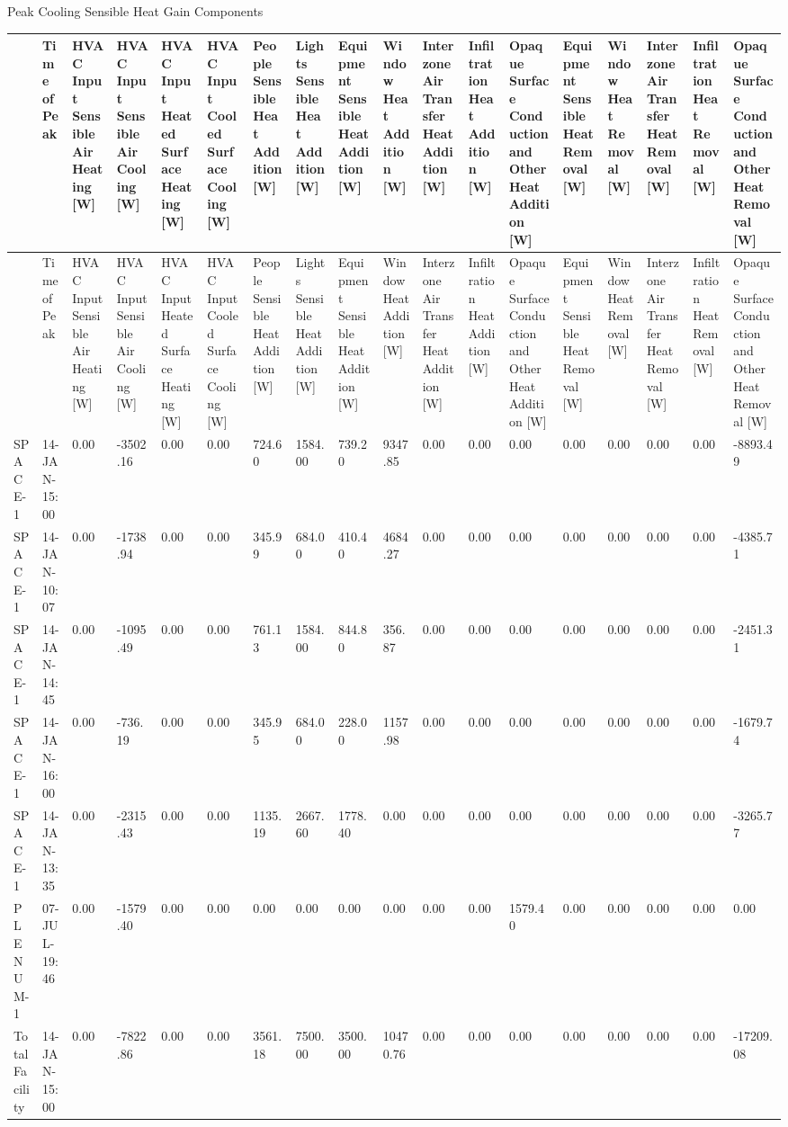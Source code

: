 Peak Cooling Sensible Heat Gain Components

{\tiny
\begin{longtable}[c]{>{\raggedright}p{0.28in}>{\raggedright}p{0.28in}>{\raggedright}p{0.28in}>{\raggedright}p{0.28in}>{\raggedright}p{0.28in}>{\raggedright}p{0.28in}>{\raggedright}p{0.28in}>{\raggedright}p{0.28in}>{\raggedright}p{0.28in}>{\raggedright}p{0.28in}>{\raggedright}p{0.28in}>{\raggedright}p{0.28in}>{\raggedright}p{0.28in}>{\raggedright}p{0.28in}>{\raggedright}p{0.28in}>{\raggedright}p{0.28in}>{\raggedright}p{0.28in}>{\raggedright}p{0.28in}}
\toprule
 & Time of Peak & HVAC Input Sensible Air Heating [W] & HVAC Input Sensible Air Cooling [W] & HVAC Input Heated Surface Heating [W] & HVAC Input Cooled Surface Cooling [W] & People Sensible Heat Addition [W] & Lights Sensible Heat Addition [W] & Equipment Sensible Heat Addition [W] & Window Heat Addition [W] & Interzone Air Transfer Heat Addition [W] & Infiltration Heat Addition [W] & Opaque Surface Conduction and Other Heat Addition [W] & Equipment Sensible Heat Removal [W] & Window Heat Removal [W] & Interzone Air Transfer Heat Removal [W] & Infiltration Heat Removal [W] & Opaque Surface Conduction and Other Heat Removal [W] \tabularnewline
\midrule
\endfirsthead

\toprule
 & Time of Peak & HVAC Input Sensible Air Heating [W] & HVAC Input Sensible Air Cooling [W] & HVAC Input Heated Surface Heating [W] & HVAC Input Cooled Surface Cooling [W] & People Sensible Heat Addition [W] & Lights Sensible Heat Addition [W] & Equipment Sensible Heat Addition [W] & Window Heat Addition [W] & Interzone Air Transfer Heat Addition [W] & Infiltration Heat Addition [W] & Opaque Surface Conduction and Other Heat Addition [W] & Equipment Sensible Heat Removal [W] & Window Heat Removal [W] & Interzone Air Transfer Heat Removal [W] & Infiltration Heat Removal [W] & Opaque Surface Conduction and Other Heat Removal [W] \tabularnewline
\midrule
\endhead

SPACE\-1-1 & 14-JAN-15:00 & 0.00 & -3502.16 & 0.00 & 0.00 & 724.60 & 1584.00 & 739.20 & 9347.85 & 0.00 & 0.00 & 0.00 & 0.00 & 0.00 & 0.00 & 0.00 & -8893.49 \tabularnewline
SPACE\-2-1 & 14-JAN-10:07 & 0.00 & -1738.94 & 0.00 & 0.00 & 345.99 & 684.00 & 410.40 & 4684.27 & 0.00 & 0.00 & 0.00 & 0.00 & 0.00 & 0.00 & 0.00 & -4385.71 \tabularnewline
SPACE\-3-1 & 14-JAN-14:45 & 0.00 & -1095.49 & 0.00 & 0.00 & 761.13 & 1584.00 & 844.80 & 356.87 & 0.00 & 0.00 & 0.00 & 0.00 & 0.00 & 0.00 & 0.00 & -2451.31 \tabularnewline
SPACE\-4-1 & 14-JAN-16:00 & 0.00 & -736.19 & 0.00 & 0.00 & 345.95 & 684.00 & 228.00 & 1157.98 & 0.00 & 0.00 & 0.00 & 0.00 & 0.00 & 0.00 & 0.00 & -1679.74 \tabularnewline
SPACE\-5-1 & 14-JAN-13:35 & 0.00 & -2315.43 & 0.00 & 0.00 & 1135.19 & 2667.60 & 1778.40 & 0.00 & 0.00 & 0.00 & 0.00 & 0.00 & 0.00 & 0.00 & 0.00 & -3265.77 \tabularnewline
PLE\-NUM-1 & 07-JUL-19:46 & 0.00 & -1579.40 & 0.00 & 0.00 & 0.00 & 0.00 & 0.00 & 0.00 & 0.00 & 0.00 & 1579.40 & 0.00 & 0.00 & 0.00 & 0.00 & 0.00 \tabularnewline
Total Facility & 14-JAN-15:00 & 0.00 & -7822.86 & 0.00 & 0.00 & 3561.18 & 7500.00 & 3500.00 & 10470.76 & 0.00 & 0.00 & 0.00 & 0.00 & 0.00 & 0.00 & 0.00 & -17209.08 \tabularnewline
\bottomrule
\end{longtable}}

